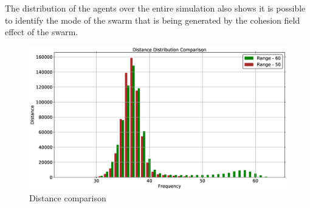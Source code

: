 The distribution of the agents over the entire simulation also shows it is possible to identify the mode of the swarm that is being generated by the cohesion field effect of the swarm. 
\begin{figure}[H]
\begin{center}
\includegraphics[width=13cm]{CHAPTER-5/figures/DistanceDistributionComparison}
\end{center}
\caption{Distance comparison\label{methods:DistanceDistributionComparison}}
\end{figure}

